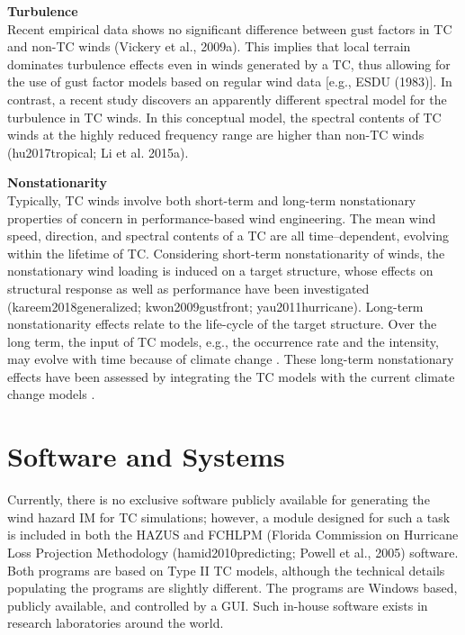 \noindent\textbf{Turbulence} \\Recent empirical data shows no significant difference between gust factors in TC and non-TC winds (Vickery et al., 2009a). This implies that local terrain dominates turbulence effects even in winds generated by a TC, thus allowing for the use of gust factor models based on regular wind data [e.g., ESDU (1983)]. In contrast, a recent study discovers an apparently different spectral model for the turbulence in TC winds. In this conceptual model, the spectral contents of TC winds at the highly reduced frequency range are higher than non-TC winds (hu2017tropical; Li et al. 2015a).
\newline

\noindent\textbf{Nonstationarity} \\Typically, TC winds involve both short-term and long-term nonstationary properties of concern in performance-based wind engineering. The mean wind speed, direction, and spectral contents of a TC are all time–dependent, evolving within the lifetime of TC. Considering short-term nonstationarity of winds, the nonstationary wind loading is induced on a target structure, whose effects on structural response as well as performance have been investigated (kareem2018generalized; kwon2009gustfront; yau2011hurricane). Long-term nonstationarity effects relate to the life-cycle of the target structure. Over the long term, the input of TC models, e.g., the occurrence rate and the intensity, may evolve with time because of climate change \citep{emanuel2005increasing}. These long-term nonstationary effects have been assessed by integrating the TC models with the current climate change models \citep{emanuel2008hurricanes,lauren2014assessing,lin2015integrated,liu2014projections}.

\section{Software and Systems}
\label{sec:storm_wind_tools}

Currently, there is no exclusive software publicly available for generating the wind hazard IM for TC simulations; however, a module designed for such a task is included in both the HAZUS \citep{vickery2006hazusmh} and FCHLPM (Florida Commission on Hurricane Loss Projection Methodology (hamid2010predicting; Powell et al., 2005) software. Both programs are based on Type II TC models, although the technical details populating the programs are slightly different. The programs are Windows based, publicly available, and controlled by a GUI. Such in-house software exists in research laboratories around the world.

%
